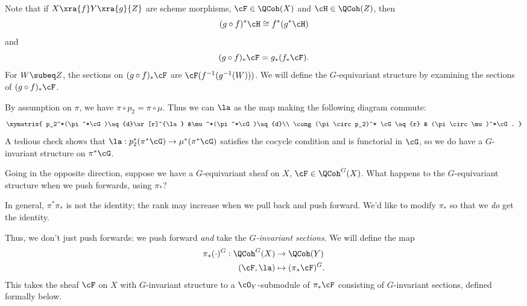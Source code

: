 Note that if $X\xra{f}Y\xra{g}{Z}$ are scheme morphisms, $\cF\in \QCoh(X)$ and $\cH\in \QCoh(Z)$, then
\[
(g\circ f)^* \cH\cong f^*(g^*\cH)
\]
and
\[
(g\circ f)_*\cF=g_*(f_*\cF).
\]
For $W\subeq Z$, the sections on $(g\circ f)_*\cF$ are  $\cF(f^{-1}(g^{-1}(W)))$. We will define the $G$-equivariant structure by examining the sections of $(g\circ f)_*\cF$.

By assumption on $\pi$, we have $\pi\circ p_2=\pi\circ \mu$. Thus we can $\la$ as the map making the following diagram commute:
\[
\xymatrix{
p_2^*(\pi^*\cG)\aq{d}\ar[r]^{\la} &\mu^*(\pi^*\cG)\aq{d}\\
\cong (\pi\circ p_2)^* \cG \aq{r} & (\pi\circ \mu)^*\cG.
}
\]
A tedious check shows that $\la:p_2^*(\pi^*\cG)\to \mu^*(\pi^*\cG)$ satisfies the cocycle condition and is functorial in $\cG$, so we do have a $G$-invariant structure on $\pi^*\cG$.

Going in the opposite direction, suppose we have a $G$-equivariant sheaf on $X$, $\cF\in \QCoh^G(X)$. What happens to the $G$-equivariant structure when we push forwards, using $\pi_*$?

In general, $\pi^*\pi_*$ is not the identity; the rank may increase when we pull back and push forward. We'd like to modify $\pi_*$ so that we {\it do} get the identity.

Thus, we don't just push forwards: we push forward {\it and} take the {\it $G$-invariant sections}. We will define the map
\begin{align*}
\pi_*(\cdot)^G:\QCoh^G(X)&\to \QCoh(Y)\\
(\cF, \la)&\mapsto (\pi_*\cF)^G.
\end{align*}
This takes the sheaf $\cF$ on $X$ with $G$-invariant structure to a $\cO_Y$-submodule of $\pi_*\cF$ consisting of $G$-invariant sections, defined formally below.

